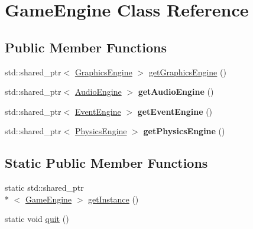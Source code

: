 \hypertarget{class_game_engine}{\section{Game\-Engine Class Reference}
\label{class_game_engine}
}
\subsection*{Public Member Functions}
\begin{DoxyCompactItemize}
\item 
std\-::shared\-\_\-ptr$<$ \hyperlink{class_graphics_engine}{Graphics\-Engine} $>$ \hyperlink{class_game_engine_a10c91cd56528ce209be73a3615344162}{get\-Graphics\-Engine} ()
\item 
\hypertarget{class_game_engine_a16079637ac6cec6858363df6ed0839e0}{std\-::shared\-\_\-ptr$<$ \hyperlink{class_audio_engine}{Audio\-Engine} $>$ {\bfseries get\-Audio\-Engine} ()}\label{class_game_engine_a16079637ac6cec6858363df6ed0839e0}

\item 
\hypertarget{class_game_engine_ab98de0442f4e10c949af471dad58e4ec}{std\-::shared\-\_\-ptr$<$ \hyperlink{class_event_engine}{Event\-Engine} $>$ {\bfseries get\-Event\-Engine} ()}\label{class_game_engine_ab98de0442f4e10c949af471dad58e4ec}

\item 
\hypertarget{class_game_engine_ae797dc87781387dcefb5774694b6f381}{std\-::shared\-\_\-ptr$<$ \hyperlink{class_physics_engine}{Physics\-Engine} $>$ {\bfseries get\-Physics\-Engine} ()}\label{class_game_engine_ae797dc87781387dcefb5774694b6f381}

\end{DoxyCompactItemize}
\subsection*{Static Public Member Functions}
\begin{DoxyCompactItemize}
\item 
static std\-::shared\-\_\-ptr\\*
$<$ \hyperlink{class_game_engine}{Game\-Engine} $>$ \hyperlink{class_game_engine_a807d71baeaa130372e16f708b77ecf9d}{get\-Instance} ()
\item 
static void \hyperlink{class_game_engine_ad82b626def2e52b28f0d6c2d167589f6}{quit} ()
\end{DoxyCompactItemize}


